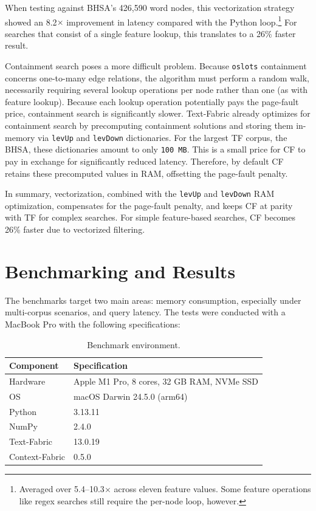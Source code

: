 \documentclass[11pt,a4paper]{article}
\begin{document}
\noindent When testing against BHSA's 426,590 word nodes, this vectorization strategy 
showed an 8.2$\times$ improvement in latency compared with the Python loop.\footnote{
    Averaged over 5.4--10.3$\times$ across eleven feature values. Some feature operations like
    regex searches still require the per-node loop, however.
}
For searches that consist of a single feature lookup, this translates to a 26\% faster result. 

Containment search poses a more difficult problem. Because \texttt{oslots} containment concerns one-to-many edge
relations, the algorithm must perform a random walk, necessarily requiring several lookup operations
per node rather than one (as with feature lookup). Because each lookup operation potentially pays the page-fault
price, containment search is significantly slower. Text-Fabric already optimizes for containment search by
precomputing containment solutions and storing them in-memory via \texttt{levUp} and \texttt{levDown} dictionaries.
For the largest TF corpus, the BHSA, these dictionaries amount to only \texttt{100 MB}. This is a small price
for CF to pay in exchange for significantly reduced latency. Therefore, by default CF retains these precomputed
values in RAM, offsetting the page-fault penalty.

In summary, vectorization, combined with the \texttt{levUp} and \texttt{levDown} RAM optimization,
compensates for the page-fault penalty, and keeps CF at parity with TF for complex searches.
For simple feature-based searches, CF becomes 26\% faster due to vectorized filtering.

\section{Benchmarking and Results}

The benchmarks target two main areas: memory consumption, especially under multi-corpus scenarios,
and query latency. The tests were conducted with a MacBook Pro with the following specifications:

\begin{table}[htbp]
\centering
\caption{Benchmark environment.}
\label{tab:benchmark_environment}
\begin{tabular}{ll}
\toprule
\textbf{Component} & \textbf{Specification} \\
\midrule
Hardware & Apple M1 Pro, 8 cores, 32 GB RAM, NVMe SSD \\
OS & macOS Darwin 24.5.0 (arm64) \\
Python & 3.13.11 \\
NumPy & 2.4.0 \\
Text-Fabric & 13.0.19 \\
Context-Fabric & 0.5.0 \\
\bottomrule
\end{tabular}
\end{table}
\end{document}
